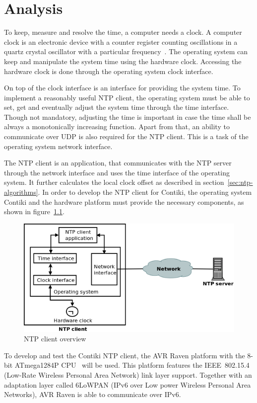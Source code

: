 
\chapter{Analysis}
To keep, measure and resolve the time, a computer needs a clock.
A computer clock is an electronic device with a counter register counting oscillations in a
quartz crystal oscillator with a particular frequency~\cite{thesis-sync}.
The operating system can keep and manipulate the system time using the hardware clock.
Accessing the hardware clock is done through the operating system clock interface.

On top of the clock interface is an interface for providing the system time.
To implement a reasonably useful NTP client,
the operating system must be able to set, get and eventually adjust the system time
through the time interface.
Though not mandatory, adjusting the time is important
in case the time shall be always a monotonically increasing function.
Apart from that, an ability to communicate over UDP is also required for the NTP client.
This is a task of the operating system network interface.

The NTP client is an application, that communicates with the NTP server through the network interface
and uses the time interface of the operating system.
It further calculates the local clock offset as described in section~\ref{sec:ntp-algorithms}.
In order to develop the NTP client for Contiki,
the operating system Contiki and the hardware platform must provide the necessary
components, as shown in figure~\ref{fig:analysis-overview}.
\begin{figure}
  \centering
  \includegraphics[width=13cm,keepaspectratio]{fig/analysis.png}
  \caption{NTP client overview}
  \label{fig:analysis-overview}
\end{figure}

To develop and test the Contiki NTP client,
the AVR Raven platform with the 8-bit ATmega1284P CPU~\cite{avr-datasheet} will be used.
This platform features the IEEE~802.15.4 (Low-Rate Wireless Personal Area Network) link layer support.
Together with an adaptation layer called 6LoWPAN (IPv6 over Low power Wireless Personal Area Networks),
AVR Raven is able to communicate over IPv6.








